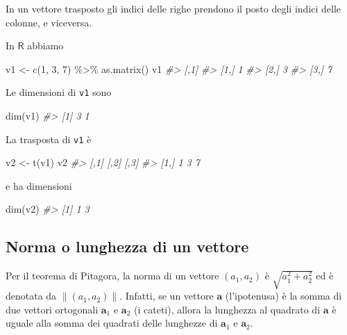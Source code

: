 \documentclass[
  11pt,
]{krantz}
\makeatletter
\newenvironment{Shaded}{\begin{snugshade}}{\end{snugshade}}
\newcommand{\CommentTok}[1]{\textcolor[rgb]{0.37,0.37,0.37}{\textit{#1}}}
\newcommand{\DecValTok}[1]{\textcolor[rgb]{0.06,0.06,0.06}{#1}}
\newcommand{\FunctionTok}[1]{\textcolor[rgb]{0,0,0}{#1}}
\newcommand{\NormalTok}[1]{#1}
\newcommand{\OtherTok}[1]{\textcolor[rgb]{0.37,0.37,0.37}{#1}}
\newcommand{\SpecialCharTok}[1]{\textcolor[rgb]{0,0,0}{#1}}
\newenvironment{kframe}{%
\medskip{}
\setlength{\fboxsep}{.8em}
 \def\at@end@of@kframe{}%
 \ifinner\ifhmode%
  \def\at@end@of@kframe{\end{minipage}}%
  \begin{minipage}{\columnwidth}%
 \fi\fi%
 \def\FrameCommand##1{\hskip\@totalleftmargin \hskip-\fboxsep
 \colorbox{shadecolor}{##1}\hskip-\fboxsep
     \hskip-\linewidth \hskip-\@totalleftmargin \hskip\columnwidth}%
 \MakeFramed {\advance\hsize-\width
   \@totalleftmargin\z@ \linewidth\hsize
   \@setminipage}}%
 {\par\unskip\endMakeFramed%
 \at@end@of@kframe}
\renewenvironment{Shaded}{\begin{kframe}}{\end{kframe}}
\theoremstyle{definition}
\theoremstyle{definition}
\theoremstyle{definition}
\theoremstyle{definition}
\theoremstyle{remark}
\makeatother
\begin{document}
In un vettore trasposto gli indici delle righe prendono il posto degli indici delle colonne, e viceversa.

In \(\mathsf{R}\) abbiamo

\begin{Shaded}
\begin{Highlighting}[]
\NormalTok{v1 }\OtherTok{\textless{}{-}} \FunctionTok{c}\NormalTok{(}\DecValTok{1}\NormalTok{, }\DecValTok{3}\NormalTok{, }\DecValTok{7}\NormalTok{) }\SpecialCharTok{\%\textgreater{}\%}
  \FunctionTok{as.matrix}\NormalTok{()}
\NormalTok{v1}
\CommentTok{\#\textgreater{}      [,1]}
\CommentTok{\#\textgreater{} [1,]    1}
\CommentTok{\#\textgreater{} [2,]    3}
\CommentTok{\#\textgreater{} [3,]    7}
\end{Highlighting}
\end{Shaded}

Le dimensioni di \texttt{v1} sono

\begin{Shaded}
\begin{Highlighting}[]
\FunctionTok{dim}\NormalTok{(v1)}
\CommentTok{\#\textgreater{} [1] 3 1}
\end{Highlighting}
\end{Shaded}

La trasposta di \texttt{v1} è

\begin{Shaded}
\begin{Highlighting}[]
\NormalTok{v2 }\OtherTok{\textless{}{-}} \FunctionTok{t}\NormalTok{(v1)}
\NormalTok{v2}
\CommentTok{\#\textgreater{}      [,1] [,2] [,3]}
\CommentTok{\#\textgreater{} [1,]    1    3    7}
\end{Highlighting}
\end{Shaded}

e ha dimensioni

\begin{Shaded}
\begin{Highlighting}[]
\FunctionTok{dim}\NormalTok{(v2)}
\CommentTok{\#\textgreater{} [1] 1 3}
\end{Highlighting}
\end{Shaded}

\hypertarget{norma-o-lunghezza-di-un-vettore}{%
\subsection{Norma o lunghezza di un vettore}\label{norma-o-lunghezza-di-un-vettore}}

Per il teorema di Pitagora, la norma di un vettore \((a_1, a_2)\) è \(\sqrt{a_1^2 + a_2^2}\) ed è denotata da \(\| (a_1, a_2) \|\). Infatti, se un vettore \(\boldsymbol{a}\) (l'ipotenusa) è la somma di due vettori ortogonali \(\boldsymbol{a}_1\) e \(\boldsymbol{a}_2\) (i cateti), allora la lunghezza al quadrato di \(\boldsymbol{a}\) è uguale alla somma dei quadrati delle lunghezze di \(\boldsymbol{a}_1\) e \(\boldsymbol{a}_2\).
\end{document}
